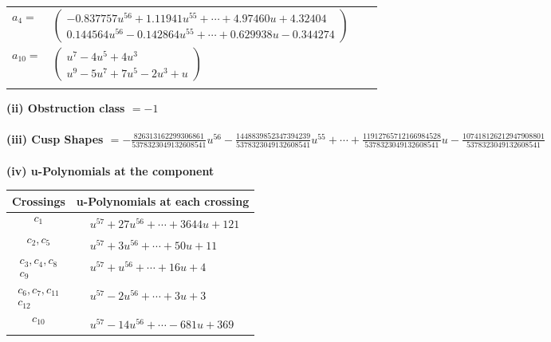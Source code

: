\documentclass[1p]{elsarticle_modified}
\theoremstyle{definition}
\begin{document}
\begin{tabular}{m{7pt} m{180pt} m{7pt} m{180pt} }
\flushright $a_{4}=$&$\begin{pmatrix}-0.837757 u^{56}+1.11941 u^{55}+\cdots+4.97460 u+4.32404\\0.144564 u^{56}-0.142864 u^{55}+\cdots+0.629938 u-0.344274\end{pmatrix}$ \\
\flushright $a_{10}=$&$\begin{pmatrix}u^7-4 u^5+4 u^3\\u^9-5 u^7+7 u^5-2 u^3+u\end{pmatrix}$\\&\end{tabular}
\flushleft \textbf{(ii) Obstruction class $= -1$}\\~\\
\flushleft \textbf{(iii) Cusp Shapes $= -\frac{826313162299306861}{5378323049132608541} u^{56}-\frac{1448839852347394239}{5378323049132608541} u^{55}+\cdots+\frac{11912765712166984528}{5378323049132608541} u-\frac{107418126212947908801}{5378323049132608541}$}\\~\\
\newpage\renewcommand{\arraystretch}{1}
\flushleft \textbf{(iv) u-Polynomials at the component}\newline \\
\begin{tabular}{m{50pt}|m{274pt}}
Crossings & \hspace{64pt}u-Polynomials at each crossing \\
\hline $$\begin{aligned}c_{1}\end{aligned}$$&$\begin{aligned}
&u^{57}+27 u^{56}+\cdots+3644 u+121
\end{aligned}$\\
\hline $$\begin{aligned}c_{2},c_{5}\end{aligned}$$&$\begin{aligned}
&u^{57}+3 u^{56}+\cdots+50 u+11
\end{aligned}$\\
\hline $$\begin{aligned}c_{3},c_{4},c_{8}\\c_{9}\end{aligned}$$&$\begin{aligned}
&u^{57}+u^{56}+\cdots+16 u+4
\end{aligned}$\\
\hline $$\begin{aligned}c_{6},c_{7},c_{11}\\c_{12}\end{aligned}$$&$\begin{aligned}
&u^{57}-2 u^{56}+\cdots+3 u+3
\end{aligned}$\\
\hline $$\begin{aligned}c_{10}\end{aligned}$$&$\begin{aligned}
&u^{57}-14 u^{56}+\cdots-681 u+369
\end{aligned}$\\
\hline
\end{tabular}\\~\\
\end{document}
